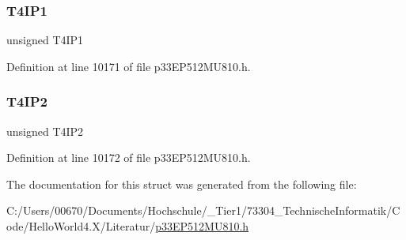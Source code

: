 \subsubsection{\texorpdfstring{T4\+I\+P1}{T4IP1}}
{\footnotesize\ttfamily unsigned T4\+I\+P1}



Definition at line 10171 of file p33\+E\+P512\+M\+U810.\+h.

\mbox{\label{structtag_i_p_c6_b_i_t_s_adf37fd156faab704f1204919c768cb1f}} 
\subsubsection{\texorpdfstring{T4\+I\+P2}{T4IP2}}
{\footnotesize\ttfamily unsigned T4\+I\+P2}



Definition at line 10172 of file p33\+E\+P512\+M\+U810.\+h.



The documentation for this struct was generated from the following file\+:\begin{DoxyCompactItemize}
\item 
C\+:/\+Users/00670/\+Documents/\+Hochschule/\+\_\+\+Tier1/73304\+\_\+\+Technische\+Informatik/\+Code/\+Hello\+World4.\+X/\+Literatur/\hyperlink{p33_e_p512_m_u810_8h}{p33\+E\+P512\+M\+U810.\+h}\end{DoxyCompactItemize}
